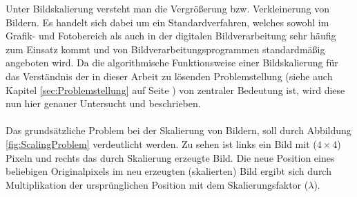 \documentclass[
fontsize=10pt, 
listof = totoc,
parskip = half	
]{report}
\begin{document}
Unter Bildskalierung versteht man die Vergrößerung bzw. Verkleinerung von Bildern. Es handelt sich dabei um ein Standardverfahren, welches sowohl im Grafik- und Fotobereich als auch in der digitalen Bildverarbeitung sehr häufig zum Einsatz kommt und von Bildverarbeitungsprogrammen standardmäßig angeboten wird. Da die algorithmische Funktionsweise einer Bildskalierung für das Verständnis der in dieser Arbeit zu lösenden Problemstellung (siehe auch Kapitel \ref{sec:Problemstellung} auf Seite \pageref{sec:Problemstellung}) von zentraler Bedeutung ist, wird diese nun hier genauer Untersucht und beschrieben.
\\\\
Das grundsätzliche Problem bei der Skalierung von Bildern, soll durch Abbildung \ref{fig:ScalingProblem} verdeutlicht werden. Zu sehen ist links ein Bild mit ($4\times 4$) Pixeln und rechts das durch Skalierung erzeugte Bild. Die neue Position eines beliebigen Originalpixels im neu erzeugten (skalierten) Bild ergibt sich durch Multiplikation der ursprünglichen Position mit dem Skalierungsfaktor ($\lambda$).
\end{document}
